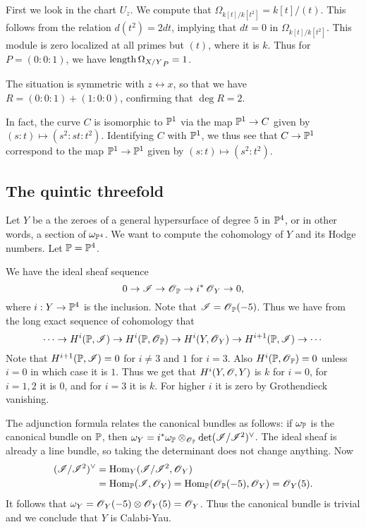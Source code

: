 \documentclass[11pt, english]{article}
\begin{document}
First we look in the chart $U_z$. We compute that $\Omega_{k[t]/k[t^2]} = k[t]/(t)$. This follows from the relation $d(t^2)=2dt$, implying that $dt=0$ in $\Omega_{k[t]/k[t^2]}$. This module is zero localized at all primes but $(t)$, where it is $k$. Thus for $P=(0:0:1)$, we have $\mathrm{length} \, {\Omega_{X/Y}}_P = 1$.

The situation is symmetric with $z \leftrightarrow x$, so that we have $R = (0:0:1) + (1:0:0)$, confirming that $\deg R=2$. 

In fact, the curve $C$ is isomorphic to $\mathbb{P}^1$ via the map $\mathbb{P}^1 \to C$ given by $(s:t) \mapsto (s^2:st:t^2)$. Identifying $C$ with $\mathbb{P}^1$, we thus see that $C \to \mathbb{P}^1$ correspond to the map $\mathbb{P}^1 \to \mathbb{P}^1$ given by $(s:t) \mapsto (s^2:t^2)$. 

\subsection{The quintic threefold}

Let $Y$ be a the zeroes of a general hypersurface of degree $5$ in $\mathbb{P}^4$, or in other words, a section of $\omega_{\mathbb{P}^4}$. We want to compute the cohomology of $Y$ and its Hodge numbers. Let $\mathbb{P} = \mathbb{P}^4$.

We have the ideal sheaf sequence
$$
0 \to \mathscr I \to \operatorname{\mathscr{O}}_{\mathbb{P}} \to i^\ast \operatorname{\mathscr{O}}_Y \to 0,
$$
where $i:Y \to \mathbb{P}^4$ is the inclusion. Note that $\mathscr I = \operatorname{\mathscr{O}}_{\mathbb{P}}(-5)$. Thus we have from the long exact sequence of cohomology that
$$
\cdots \to H^i(\mathbb{P}, \mathscr I) \to H^i(\mathbb{P},\operatorname{\mathscr{O}}_{\mathbb{P}}) \to H^i(Y,\operatorname{\mathscr{O}}_Y) \to H^{i+1}(\mathbb{P},\mathscr I) \to \cdots
$$
Note that $H^{i+1}(\mathbb{P},\mathscr I) = 0$ for $i \neq 3$ and $1$ for $i=3$. Also $H^i(\mathbb{P},\operatorname{\mathscr{O}}_{\mathbb{P}})=0$ unless $i=0$ in which case it is $1$. Thus we get that $H^i(Y,\operatorname{\mathscr{O}},Y)$ is $k$ for $i=0$, for $i=1,2$ it is $0$, and for $i=3$ it is $k$. For higher $i$ it is zero by Grothendieck vanishing.

The adjunction formula relates the canonical bundles as follows: if $\omega_{\mathbb{P}}$ is the canonical bundle on $\mathbb{P}$, then $\omega_Y = i^\ast \omega_{\mathbb{P}} \otimes_{\operatorname{\mathscr{O}}_{\mathbb{P}}} \det(\mathscr I/\mathscr I^2)^\vee$. The ideal sheaf is already a line bundle, so taking the determinant does not change anything. Now
\begin{align*}
(\mathscr I/\mathscr I^2)^\vee &= \operatorname{Hom}_Y(\mathscr I/\mathscr I^2,\operatorname{\mathscr{O}}_Y) \\
&= \operatorname{Hom}_{\mathbb{P}}(\mathscr I,\operatorname{\mathscr{O}}_Y)=\operatorname{Hom}_{\mathbb{P}}(\operatorname{\mathscr{O}}_{\mathbb{P}}(-5),\operatorname{\mathscr{O}}_Y)=\operatorname{\mathscr{O}}_Y(5).
\end{align*}
It follows that $\omega_Y = \operatorname{\mathscr{O}}_Y(-5) \otimes \operatorname{\mathscr{O}}_Y(5)=\operatorname{\mathscr{O}}_Y$. Thus the canonical bundle is trivial and we conclude that $Y$ is Calabi-Yau.
\end{document}
